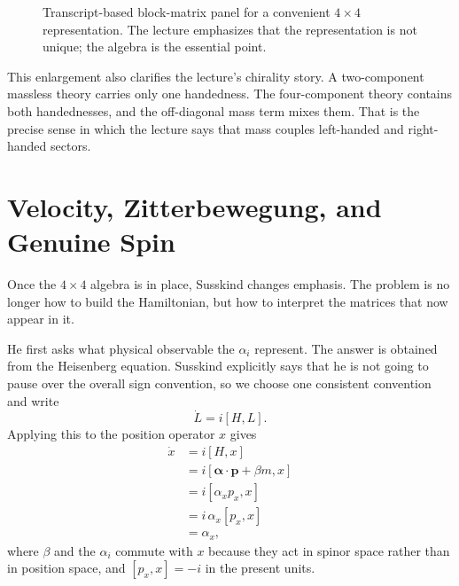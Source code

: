 \begin{figure}[ht]
\centering
{}
\caption{Transcript-based block-matrix panel for a convenient \(4\times4\) representation. The lecture emphasizes that the representation is not unique; the algebra is the essential point.}
\label{fig:aqm10-dirac-blocks}
\end{figure}

This enlargement also clarifies the lecture's chirality story. A two-component massless theory carries only one handedness. The four-component theory contains both handednesses, and the off-diagonal mass term mixes them. That is the precise sense in which the lecture says that mass couples left-handed and right-handed sectors.

\section{Velocity, Zitterbewegung, and Genuine Spin}

Once the \(4\times4\) algebra is in place, Susskind changes emphasis. The problem is no longer how to build the Hamiltonian, but how to interpret the matrices that now appear in it.

He first asks what physical observable the \(\alpha_i\) represent. The answer is obtained from the Heisenberg equation. Susskind explicitly says that he is not going to pause over the overall sign convention, so we choose one consistent convention and write
\begin{equation}
\dot L=i[H,L].
\end{equation}
Applying this to the position operator \(x\) gives
\begin{align}
\dot x
&=
i[H,x] \\
&=
i[\boldsymbol{\alpha}\cdot\mathbf p+\beta m,x] \\
&=
i[\alpha_x p_x,x] \\
&=
i\,\alpha_x[p_x,x] \\
&=
\alpha_x,
\end{align}
where \(\beta\) and the \(\alpha_i\) commute with \(x\) because they act in spinor space rather than in position space, and \([p_x,x]=-i\) in the present units.

